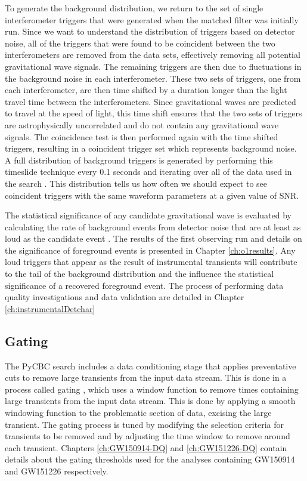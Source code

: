 To generate the background distribution, we return to the set of single interferometer 
triggers that were generated when the matched filter was initially run. Since we want 
to understand the distribution of triggers based on detector noise, all of the triggers 
that were found to be coincident between the two interferometers are removed from the 
data sets, effectively removing all
potential gravitational wave signals. The remaining triggers are then due to fluctuations 
in the background noise in each interferometer. These two sets of triggers,
one from each interferometer, are then time shifted by a duration longer than the
light travel time between the interferometers.
Since gravitational waves are predicted to travel at the speed of light,
this time shift ensures that the
two sets of triggers are astrophysically uncorrelated and do not contain any gravitational
wave signals. The coincidence test is then performed again with the time shifted triggers,
resulting in a coincident trigger set which represents background noise. 
A full distribution of background triggers is generated by performing this timeslide
technique every 0.1 seconds and iterating over all of the data used in the search 
\cite{Usman:2015kfa}. This 
distribution tells us how often we should expect to see coincident triggers with the 
same waveform parameters at a given value of SNR.

The statistical significance of any candidate gravitational wave is
evaluated by calculating the rate of background events from detector noise 
that are at least as
loud as the candidate event \cite{GW150914-CBC}. 
The results of the first observing run and details on 
the significance of foreground events is presented in Chapter \ref{ch:o1results}. 
Any loud triggers that appear as the result of instrumental
transients will contribute to the tail of the background distribution and
the influence the statistical significance of a recovered foreground event.
The process of performing data quality investigations and data validation are 
detailed in Chapter \ref{ch:instrumentalDetchar}

\subsection{Gating}\label{sec:gating}

The PyCBC search includes a data conditioning stage that applies preventative  
cuts to remove large transients from the input data stream. 
This is done in a process called gating \cite{Usman:2015kfa}, which uses a
window function to remove times containing large transients from the input data stream. This is done
by applying a smooth windowing function to the problematic section of data, excising the large transient.
The gating process is tuned by modifying the selection criteria for transients to be removed and
by adjusting the time window to remove around each transient.
Chapters \ref{ch:GW150914-DQ} and \ref{ch:GW151226-DQ} contain details about the 
gating thresholds used for the analyses containing GW150914 and GW151226 respectively. 

